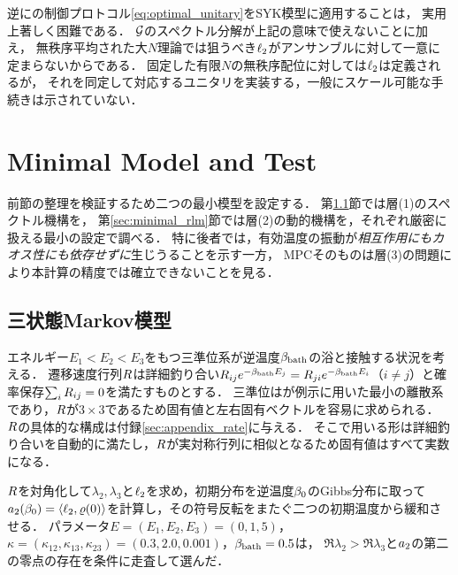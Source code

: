 \documentclass[a4paper,11pt,onecolumn,baselineskip=14.5pt]{jlreq}
\begin{document}
逆に\cite{Carollo2021}の制御プロトコル\eqref{eq:optimal_unitary}をSYK模型に適用することは，
実用上著しく困難である．
$\mathcal{G}$のスペクトル分解が上記の意味で使えないことに加え，
無秩序平均された大$N$理論では狙うべき$\ell_{2}$がアンサンブルに対して一意に定まらないからである．
固定した有限$N$の無秩序配位に対しては$\ell_{2}$は定義されるが，
それを同定して対応するユニタリを実装する，一般にスケール可能な手続きは示されていない．

\section{Minimal Model and Test}
\label{sec:minimal}

前節の整理を検証するため二つの最小模型を設定する．
第\ref{sec:minimal_markov}節では層(1)のスペクトル機構を，
第\ref{sec:minimal_rlm}節では層(2)の動的機構を，それぞれ厳密に扱える最小の設定で調べる．
特に後者では，有効温度の振動が\emph{相互作用にもカオス性にも依存せずに}生じうることを示す一方，
MPCそのものは層(3)の問題により本計算の精度では確立できないことを見る．

\subsection{三状態Markov模型}
\label{sec:minimal_markov}

エネルギー$E_1<E_2<E_3$をもつ三準位系が逆温度$\beta_{\mathrm{bath}}$の浴と接触する状況を考える．
遷移速度行列$R$は詳細釣り合い$R_{ij}e^{-\beta_{\mathrm{bath}} E_j}=R_{ji}e^{-\beta_{\mathrm{bath}} E_i}$（$i\neq j$）と確率保存$\sum_iR_{ij}=0$を満たすものとする．
三準位は\cite{Lu2017}が例示に用いた最小の離散系であり，$R$が$3\times3$であるため固有値と左右固有ベクトルを容易に求められる．
$R$の具体的な構成は付録\ref{sec:appendix_rate}に与える．
そこで用いる形は詳細釣り合いを自動的に満たし，$R$が実対称行列に相似となるため固有値はすべて実数になる．

$R$を対角化して$\lambda_2,\lambda_3$と$\ell_{2}$を求め，初期分布を逆温度$\beta_{0}$のGibbs分布に取って$a_{2}(\beta_{0})=\langle \ell_{2} , \varrho(0) \rangle$を計算し，その符号反転をまたぐ二つの初期温度から緩和させる．
パラメータ$E=(E_1,E_2,E_3)=(0,1,5)$，
$\kappa=(\kappa_{12},\kappa_{13},\kappa_{23})=(0.3,2.0,0.001)$，$\beta_{\mathrm{bath}}=0.5$は，
$\Re\lambda_2>\Re\lambda_3$と$a_{2}$の第二の零点の存在を条件に走査して選んだ．
\end{document}
